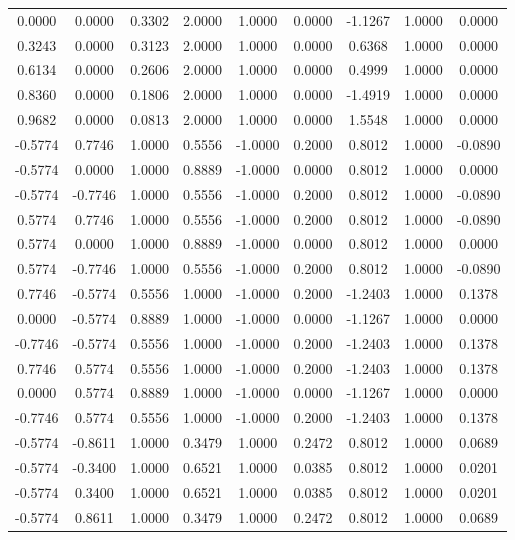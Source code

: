 \documentclass[11pt]{article}
\begin{document}
\begin{longtable}{c c|c c|c|c|c c|c}
0.0000 & 0.0000 & 0.3302 & 2.0000 & 1.0000 & 0.0000 & -1.1267 & 1.0000 & 0.0000 \\
0.3243 & 0.0000 & 0.3123 & 2.0000 & 1.0000 & 0.0000 & 0.6368 & 1.0000 & 0.0000 \\
0.6134 & 0.0000 & 0.2606 & 2.0000 & 1.0000 & 0.0000 & 0.4999 & 1.0000 & 0.0000 \\
0.8360 & 0.0000 & 0.1806 & 2.0000 & 1.0000 & 0.0000 & -1.4919 & 1.0000 & 0.0000 \\
0.9682 & 0.0000 & 0.0813 & 2.0000 & 1.0000 & 0.0000 & 1.5548 & 1.0000 & 0.0000 \\
-0.5774 & 0.7746 & 1.0000 & 0.5556 & -1.0000 & 0.2000 & 0.8012 & 1.0000 & -0.0890 \\
-0.5774 & 0.0000 & 1.0000 & 0.8889 & -1.0000 & 0.0000 & 0.8012 & 1.0000 & 0.0000 \\
-0.5774 & -0.7746 & 1.0000 & 0.5556 & -1.0000 & 0.2000 & 0.8012 & 1.0000 & -0.0890 \\
0.5774 & 0.7746 & 1.0000 & 0.5556 & -1.0000 & 0.2000 & 0.8012 & 1.0000 & -0.0890 \\
0.5774 & 0.0000 & 1.0000 & 0.8889 & -1.0000 & 0.0000 & 0.8012 & 1.0000 & 0.0000 \\
0.5774 & -0.7746 & 1.0000 & 0.5556 & -1.0000 & 0.2000 & 0.8012 & 1.0000 & -0.0890 \\
0.7746 & -0.5774 & 0.5556 & 1.0000 & -1.0000 & 0.2000 & -1.2403 & 1.0000 & 0.1378 \\
0.0000 & -0.5774 & 0.8889 & 1.0000 & -1.0000 & 0.0000 & -1.1267 & 1.0000 & 0.0000 \\
-0.7746 & -0.5774 & 0.5556 & 1.0000 & -1.0000 & 0.2000 & -1.2403 & 1.0000 & 0.1378 \\
0.7746 & 0.5774 & 0.5556 & 1.0000 & -1.0000 & 0.2000 & -1.2403 & 1.0000 & 0.1378 \\
0.0000 & 0.5774 & 0.8889 & 1.0000 & -1.0000 & 0.0000 & -1.1267 & 1.0000 & 0.0000 \\
-0.7746 & 0.5774 & 0.5556 & 1.0000 & -1.0000 & 0.2000 & -1.2403 & 1.0000 & 0.1378 \\
-0.5774 & -0.8611 & 1.0000 & 0.3479 & 1.0000 & 0.2472 & 0.8012 & 1.0000 & 0.0689 \\
-0.5774 & -0.3400 & 1.0000 & 0.6521 & 1.0000 & 0.0385 & 0.8012 & 1.0000 & 0.0201 \\
-0.5774 & 0.3400 & 1.0000 & 0.6521 & 1.0000 & 0.0385 & 0.8012 & 1.0000 & 0.0201 \\
-0.5774 & 0.8611 & 1.0000 & 0.3479 & 1.0000 & 0.2472 & 0.8012 & 1.0000 & 0.0689 \\

\end{longtable}
\end{document}
